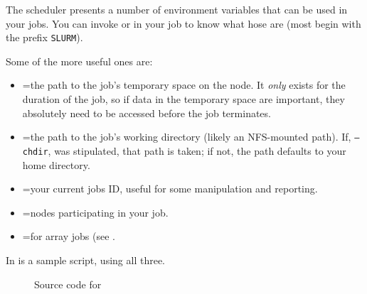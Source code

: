 The scheduler presents a number of environment variables that can be used in 
your jobs. You can invoke  or  in your
job to know what hose are (most begin with the prefix \texttt{SLURM}).

Some of the more useful ones are:

\begin{itemize}
\item
=the path to the job's temporary space on the node. It
\emph{only} exists for the duration of the job, so if data in the temporary space 
are important, they absolutely need to be accessed before the job terminates.

\item
{}=the path to the job's working directory (likely an
NFS-mounted path). If, \texttt{--chdir}, was stipulated, that path is taken; if not, 
the path defaults to your home directory.


\item
{}=your current jobs ID, useful for some manipulation
and reporting.

\item
{}=nodes participating in your job.

\item
{}=for array jobs (see .

\end{itemize}

\noindent
In  is a sample script, using all three.

\begin{figure}[htpb]
    
    \caption{Source code for }
	\label{fig:tmpdir.sh}
\end{figure}
